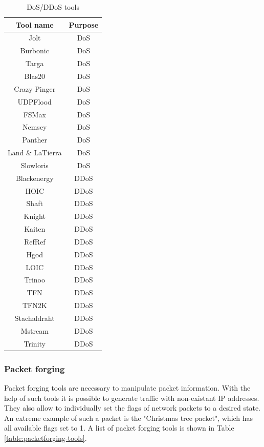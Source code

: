 \documentclass[conference]{IEEEtran}
\begin{document}
\begin{table}[htbp]
\caption{DoS/DDoS tools \cite{b1}} 
\centering
\begin{tabular}{ | c | c | }
\hline
Tool name & Purpose \\
\hline
Jolt & DoS \\
Burbonic & DoS \\
Targa & DoS \\
Blas20 & DoS \\
Crazy Pinger & DoS \\
UDPFlood & DoS \\
FSMax & DoS \\
Nemsey & DoS \\
Panther & DoS \\
Land \& LaTierra & DoS \\
Slowloris & DoS \\
Blackenergy & DDoS \\
HOIC & DDoS \\
Shaft & DDoS \\
Knight & DDoS \\
Kaiten & DDoS \\
RefRef & DDoS \\
Hgod & DDoS \\
LOIC & DDoS \\
Trinoo & DDoS \\
TFN & DDoS \\
TFN2K & DDoS \\
Stachaldraht & DDoS \\
Mstream & DDoS \\
Trinity & DDoS \\
\hline
\end{tabular}
\label{table:ddos-tools}
\end{table}

\smallskip
\subsubsection{Packet forging}
Packet forging tools are necessary to manipulate packet information. With the help of such tools it is possible to generate traffic with non-existant IP addresses. They also allow to individually set the flags of network packets to a desired state. An extreme example of such a packet is the "Christmas tree packet", which has all available flags set to 1. A list of packet forging tools is shown in Table \ref{table:packetforging-tools}.
\end{document}
